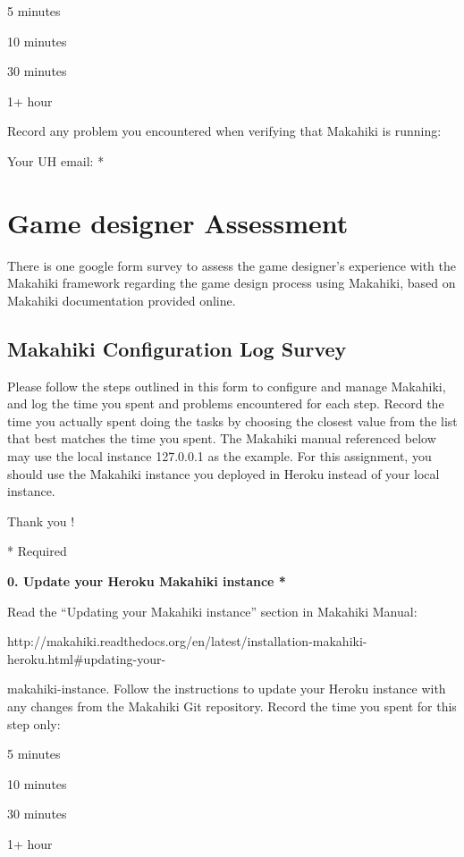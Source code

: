 \begin{radiobutton}
\item 5 minutes
\item  10 minutes
\item  30 minutes
\item  1+ hour
\end{radiobutton}

Record any problem you encountered when verifying that Makahiki is running: \underline{\hspace{3cm}}

Your UH email: * \underline{\hspace{4cm}}

\section{Game designer Assessment}

There is one google form survey to assess the game designer's experience with the Makahiki framework regarding the game design process using  Makahiki, based on Makahiki documentation provided online.

\subsection{Makahiki Configuration Log Survey}

Please follow the steps outlined in this form to configure and manage Makahiki, and log the time you spent and problems encountered for each step. Record the time you actually spent doing the tasks by choosing the closest value from the list that best matches the time you spent.
The Makahiki manual referenced below may use the local instance 127.0.0.1 as the example. For this assignment, you should use the Makahiki instance you deployed in Heroku instead of your local instance.

Thank you !

* Required

{\bf 0. Update your Heroku Makahiki instance *}

Read the ``Updating your Makahiki instance'' section in Makahiki Manual:

http://makahiki.readthedocs.org/en/latest/installation-makahiki-heroku.html\#updating-your-

makahiki-instance. Follow the instructions to update your Heroku instance with any changes from the Makahiki Git repository. Record the time you spent for this step only:

\begin{radiobutton}
\item 5 minutes
\item  10 minutes
\item  30 minutes
\item  1+ hour
\end{radiobutton}


